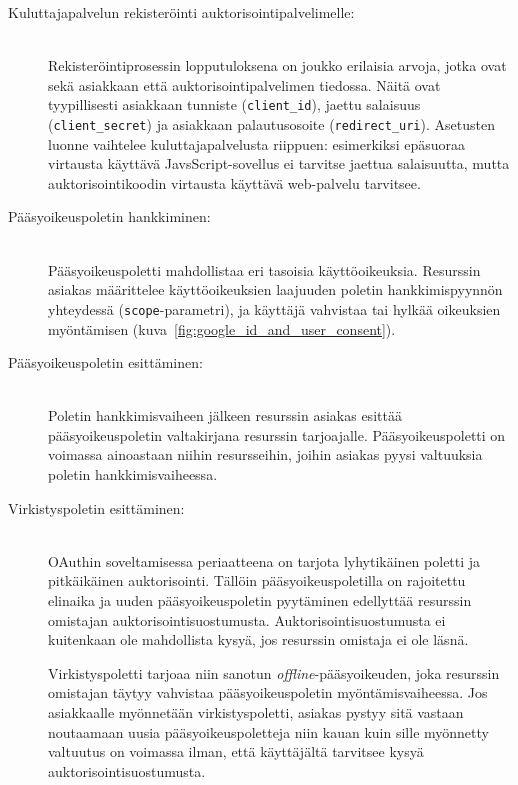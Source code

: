 \documentclass[finnish,gradu]{tktltiki}
\begin{document}
  \begin{description}
  \item[Kuluttajapalvelun rekisteröinti auktorisointipalvelimelle:] \hfill \\
   Rekisteröintiprosessin lopputuloksena on joukko erilaisia arvoja, jotka ovat sekä asiakkaan että auktorisointipalvelimen tiedossa. Näitä ovat tyypillisesti asiakkaan tunniste (\verb!client_id!), jaettu salaisuus (\verb!client_secret!) ja asiakkaan palautusosoite (\verb!redirect_uri!). Asetusten luonne vaihtelee kuluttajapalvelusta riippuen: esimerkiksi epäsuoraa virtausta käyttävä JavsScript-sovellus ei tarvitse jaettua salaisuutta, mutta auktorisointikoodin virtausta käyttävä web-palvelu tarvitsee.

  \item[Pääsyoikeuspoletin hankkiminen:] \hfill \\
  Pääsyoikeuspoletti mahdollistaa eri tasoisia käyttöoikeuksia. Resurssin asiakas määrittelee käyttöoikeuksien laajuuden poletin hankkimispyynnön yhteydessä (\verb!scope!-parametri), ja käyttäjä vahvistaa tai hylkää oikeuksien myöntämisen (kuva~\ref{fig:google_id_and_user_consent}).

  \item[Pääsyoikeuspoletin esittäminen:] \hfill \\
  Poletin hankkimisvaiheen jälkeen resurssin asiakas esittää pääsyoikeuspoletin valtakirjana resurssin tarjoajalle. Pääsyoikeuspoletti on voimassa ainoastaan niihin resursseihin, joihin asiakas pyysi valtuuksia poletin hankkimisvaiheessa.

  \item[Virkistyspoletin esittäminen:] \hfill \\
  OAuthin soveltamisessa periaatteena on tarjota lyhytikäinen poletti ja pitkäikäinen auktorisointi. Tällöin pääsyoikeuspoletilla on rajoitettu elinaika ja uuden pääsyoikeuspoletin pyytäminen edellyttää resurssin omistajan auktorisointisuostumusta. Auktorisointisuostumusta ei kuitenkaan ole mahdollista kysyä, jos resurssin omistaja ei ole läsnä.

  Virkistyspoletti tarjoaa niin sanotun \emph{offline}-pääsyoikeuden, joka resurssin omistajan täytyy vahvistaa pääsyoikeuspoletin myöntämisvaiheessa. Jos asiakkaalle myönnetään virkistyspoletti, asiakas pystyy sitä vastaan noutaamaan uusia pääsyoikeuspoletteja niin kauan kuin sille myönnetty valtuutus on voimassa ilman, että käyttäjältä tarvitsee kysyä auktorisointisuostumusta.

  \end{description}
\end{document}
